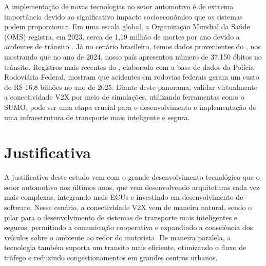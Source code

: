 A implementação de novas tecnologias no setor automotivo é de extrema importância devido ao significativo impacto socioeconômico que os sistemas podem proporcionar.
Em uma escala global, a Organização Mundial da Saúde (OMS) registra, em 2023, cerca de 1,19 milhão de mortes por ano devido a acidentes de trânsito \cite{ref:oms}.
Já no cenário brasileiro, temos dados provenientes do \cite{ref:datasus}, nos mostrando que no ano de 2024, nosso país apresentou número de 37.150 óbitos no trânsito.
Registros mais recentes do \cite{ref:panoramacnt}, elaborado com a base de dados da Polícia Rodoviária Federal, mostram que acidentes em rodovias federais geram um
custo de R\$ 16,8 bilhões no ano de 2025. Diante deste panorama, validar virtualmente a conectividade V2X por meio de simulações, utilizando ferramentas como o SUMO,
pode ser uma etapa crucial para o desenvolvimento e implementação de uma infraestrutura de transporte mais inteligente e segura.


\section{Justificativa}

A justificativa deste estudo vem com o grande desenvolvimento tecnológico que o setor automotivo nos últimos anos, que vem desenvolvendo arquiteturas cada vez mais
complexas, integrando mais ECUs e investindo em desenvolvimento de software. Nesse cenário, a conectividade V2X vem de maneira natural, sendo o pilar para o
desenvolvimento de sistemas de transporte mais inteligentes e seguros, permitindo a comunicação cooperativa e expandindo a consciência dos veículos sobre o ambiente
ao redor do motorista. De maneira paralela, a tecnologia também suporta um transito mais eficiente, otimizando o fluxo de tráfego e reduzindo congestionamentos em
grandes centros urbanos.

